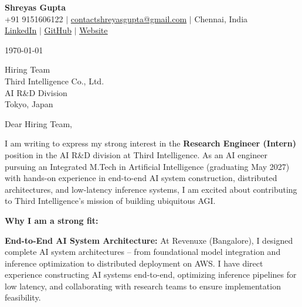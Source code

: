 \documentclass[11pt,letterpaper]{article}
\begin{document}
\begin{center}
    \textbf{\Large Shreyas Gupta} \\
    \vspace{4pt}
    +91 9151606122 $|$ \href{mailto:contactshreyasgupta@gmail.com}{contactshreyasgupta@gmail.com} $|$ Chennai, India \\
    \href{https://www.linkedin.com/in/contact-shreyas/}{\underline{LinkedIn}} $|$
    \href{https://github.com/contact-shreyas}{\underline{GitHub}} $|$
    \href{https://shreyas-gupta-portfolio-bvjtwuqfa-shreyas-projects-6592f999.vercel.app/}{\underline{Website}}
\end{center}

\vspace{14pt}

\noindent \today \\

\vspace{8pt}

\noindent Hiring Team \\
Third Intelligence Co., Ltd. \\
AI R\&D Division \\
Tokyo, Japan \\

\vspace{8pt}

\noindent Dear Hiring Team, \\

\vspace{6pt}

\noindent I am writing to express my strong interest in the \textbf{Research Engineer (Intern)} position in the AI R\&D division at Third Intelligence. As an AI engineer pursuing an Integrated M.Tech in Artificial Intelligence (graduating May 2027) with hands-on experience in end-to-end AI system construction, distributed architectures, and low-latency inference systems, I am excited about contributing to Third Intelligence's mission of building ubiquitous AGI.

\vspace{4pt}

\noindent \textbf{Why I am a strong fit:}

\vspace{4pt}

\noindent \textbf{End-to-End AI System Architecture:} At Revenuxe (Bangalore), I designed complete AI system architectures -- from foundational model integration and inference optimization to distributed deployment on AWS. I have direct experience constructing AI systems end-to-end, optimizing inference pipelines for low latency, and collaborating with research teams to ensure implementation feasibility.
\end{document}
